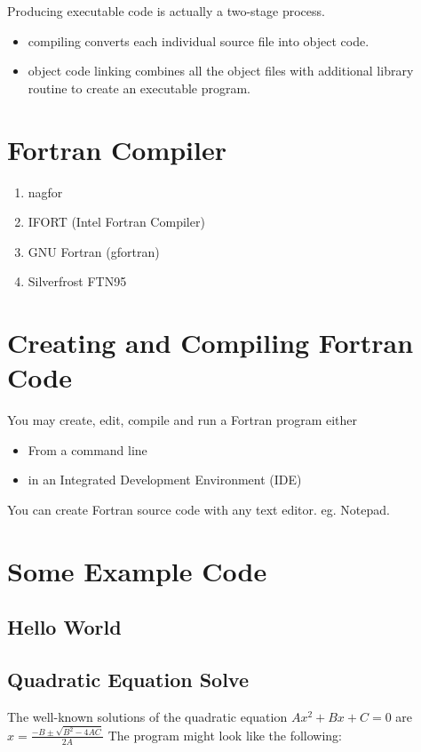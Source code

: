 \documentclass[class=book,crop=false]{standalone}
\begin{document}
    Producing executable code is actually a two-stage process.
    \begin{itemize}
        \item compiling converts each individual source file into object code.
        \item object code linking combines all the object files with additional library routine to create an executable program.
    \end{itemize}
    \section{Fortran Compiler}
    \begin{enumerate}
        \item nagfor
        \item IFORT (Intel Fortran Compiler)
        \item GNU Fortran (gfortran)
        \item Silverfrost FTN95
    \end{enumerate}
    \section{Creating and Compiling Fortran Code}
    You may create, edit, compile and run a Fortran program either 
    \begin{itemize}
        \item From a command line
        \item in an Integrated Development Environment (IDE)
    \end{itemize}
    You can create Fortran source code with any text editor. eg. Notepad.
    \section{Some Example Code}
    \subsection{Hello World}
    
    \subsection{Quadratic Equation Solve}
    The well-known solutions of the quadratic equation $ Ax^2+Bx+C=0 $ are $ x=\frac{\displaystyle-B\pm\sqrt{ B^2-4AC}}{\displaystyle 2A} $
    The program might look like the following:
    
    
\end{document}
